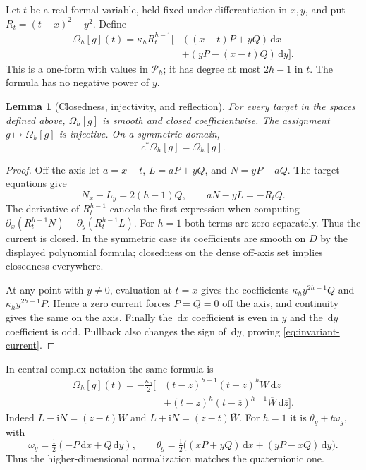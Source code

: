 \documentclass[11pt,a4paper]{article}
\numberwithin{equation}{section}
\newtheorem{lemma}[theorem]{Lemma}
\theoremstyle{definition}
\theoremstyle{remark}
\newcommand{\ii}{\mathrm i}
\newcommand{\dd}{\,\mathrm d}
\newcommand{\Pspace}{\mathscr P_h}
\newcommand{\barz}{\overline z}
\begin{document}
Let $t$ be a real formal variable, held fixed under differentiation in $x,y$,
and put $R_t=(t-x)^2+y^2$. Define
\begin{equation}\label{eq:current}
\begin{split}
 \Omega_h[g](t)=\kappa_h R_t^{h-1}\bigl[
 &((x-t)P+yQ)\dd x\\
 &+(yP-(x-t)Q)\dd y\bigr].
\end{split}
\end{equation}
This is a one-form with values in $\Pspace$; it has degree at most $2h-1$ in
$t$. The formula has no negative power of $y$.

\begin{lemma}[Closedness, injectivity, and reflection]\label{lem:current}
For every target in the spaces defined above, $\Omega_h[g]$ is smooth and
closed coefficientwise. The assignment $g\mapsto\Omega_h[g]$ is injective.
On a symmetric domain,
\begin{equation}\label{eq:invariant-current}
 c^*\Omega_h[g]=\Omega_h[g].
\end{equation}
\end{lemma}
\begin{proof}
Off the axis let $a=x-t$, $L=aP+yQ$, and $N=yP-aQ$. The target equations give
\[
 N_x-L_y=2(h-1)Q,\qquad aN-yL=-R_tQ.
\]
The derivative of $R_t^{h-1}$ cancels the first expression when computing
$\partial_x(R_t^{h-1}N)-\partial_y(R_t^{h-1}L)$. For $h=1$ both terms
are zero separately. Thus the current is closed. In the symmetric case its
coefficients are smooth on $D$ by the displayed polynomial formula;
closedness on the dense off-axis set implies closedness everywhere.

At any point with $y\ne0$, evaluation at $t=x$ gives the coefficients
$\kappa_hy^{2h-1}Q$ and $\kappa_hy^{2h-1}P$. Hence a zero current forces
$P=Q=0$ off the axis, and continuity gives the same on the axis.
Finally the $\dd x$ coefficient is even in $y$ and the $\dd y$ coefficient
is odd. Pullback also changes the sign of $\dd y$, proving
\eqref{eq:invariant-current}.
\end{proof}

In central complex notation the same formula is
\begin{equation}\label{eq:complex-current}
\begin{split}
 \Omega_h[g](t)=-\frac{\kappa_h}{2}\bigl[
 &(t-z)^{h-1}(t-\barz)^hW\dd z\\
 &+(t-z)^h(t-\barz)^{h-1}\overline W\dd\barz\bigr].
\end{split}
\end{equation}
Indeed $L-\ii N=(\barz-t)W$ and $L+\ii N=(z-t)\overline W$.
For $h=1$ it is $\theta_g+t\omega_g$, with
\[
 \omega_g=\tfrac12(-P\dd x+Q\dd y),\qquad
 \theta_g=\tfrac12\bigl((xP+yQ)\dd x+(yP-xQ)\dd y\bigr).
\]
Thus the higher-dimensional normalization matches the quaternionic one.
\end{document}
